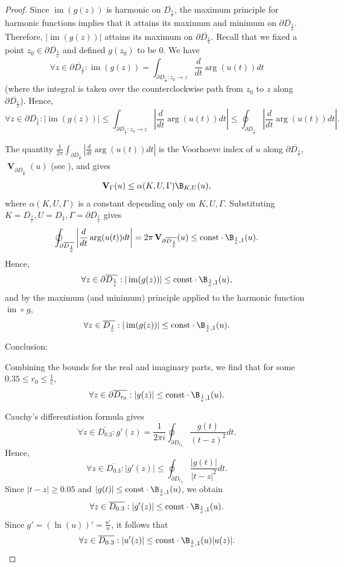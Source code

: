 \documentclass[reqno]{amsart}
\renewcommand{\paragraph}[1]{\medskip\noindent#1}
\theoremstyle{plain}
\theoremstyle{definition}
\theoremstyle{remark}
\theoremstyle{plain}
\begin{document}
\begin{proof}
Since $\operatorname{im}(g(z))$ is harmonic on $\overline{D_\frac1e}$, the maximum principle for harmonic functions implies that it attains its maximum and minimum on $\partial\overline{D_\frac1e}$. Therefore, $|\operatorname{im}(g(z))|$ attains its maximum on $\partial\overline{D_\frac1e}$. Recall that we fixed a point $z_0\in \partial\overline{D_\frac1e}$ and defined $g(z_0)$ to be $0$. We have
\[
    \forall z\in \partial\overline{D_\frac1e}:\operatorname{im}(g(z))=\int_{\partial\overline{D_\frac1e}:z_0\rightarrow z}\frac{d}{dt}\arg(u(t))dt
\]
(where the integral is taken over the counterclockwise path from $z_0$ to $z$ along $\partial\overline{D_\frac1e}$).
Hence,
\[
    \forall z\in \partial\overline{D_\frac1e}:|\operatorname{im}(g(z))|\leq\int_{\partial\overline{D_\frac1e}:z_0\rightarrow z}\left|\frac{d}{dt}\arg(u(t))dt\right|\leq\oint_{\partial\overline{D_\frac1e}}\left|\frac{d}{dt}\arg(u(t))dt\right|
.\]

The quantity $\frac1{2\pi}\int_{\partial\overline{D_\frac1e}}\left|\frac{d}{dt}\arg(u(t))dt\right|$ is the Voorhoeve index of $u$ along $\partial\overline{D_\frac1e}$, $\operatorname{\mathbf{V}}_{\partial\overline{D_\frac1e}}(u)$ (see \cite{KhovanskiiYakovenko1996GeneralizedRolleTheoremInRnAndC}), and \cite[Theorem 3]{KhovanskiiYakovenko1996GeneralizedRolleTheoremInRnAndC} gives
\[
    \operatorname{\mathbf{V}}_\Gamma(u)\leq\alpha(K,U,\Gamma)\B_{K,U}(u)
,\]
where $\alpha(K,U,\Gamma)$ is a constant depending only on $K,U,\Gamma$.
Substituting $K=\overline{D_\frac1e},U=D_1,\Gamma=\partial\overline{D_\frac1e}$ gives
\[
    \oint_{\partial\overline{D_\frac1e}}\left|\frac{d}{dt}\arg(u(t))dt\right|=2\pi\operatorname{\mathbf{V}}_{\partial\overline{D_\frac1e}}(u)\leq \mathrm{const}\cdot\B_{\frac1e,1}(u)
.\]
Hence,
\[
    \forall z\in \partial\overline{D_\frac1e}:|\operatorname{im}(g(z))|\leq \mathrm{const}\cdot\B_{\frac1e,1}(u)
,\]
and by the maximum (and minimum) principle applied to the harmonic function $\operatorname{im}\circ\,g$,
\[
    \forall z\in\overline{D_\frac1e}:|\operatorname{im}(g(z))|\leq \mathrm{const}\cdot\B_{\frac1e,1}(u)
.\]

\paragraph{Conclusion:}

Combining the bounds for the real and imaginary parts, we find that for some $0.35\leq r_0\leq\frac1e$,
\[
    \forall z\in \partial\overline{D_{r_0}}:|g(z)|\leq \mathrm{const}\cdot\B_{\frac1e,1}(u)
.\]

Cauchy's differentiation formula gives
\[
    \forall z\in\overline{D_{0.3}}:g'(z)=\frac1{2\pi i}\oint_{\partial\overline{D_{r_0}}}\frac{g(t)}{(t-z)^2}dt
.\]
Hence,
\[
    \forall z\in\overline{D_{0.3}}:|g'(z)|\leq\oint_{\partial\overline{D_{r_0}}}\frac{|g(t)|}{|t-z|^2}dt
.\]
Since $|t-z|\geq 0.05$ and $|g(t)|\leq \mathrm{const}\cdot\B_{\frac1e,1}(u)$, we obtain
\[
    \forall z\in\overline{D_{0.3}}:|g'(z)|\leq \mathrm{const}\cdot\B_{\frac1e,1}(u)
.\]
Since $g'=\left(\ln(u)\right)'=\frac{u'}{u}$, it follows that
\[
    \forall z\in\overline{D_{0.3}}:|u'(z)|\leq \mathrm{const}\cdot\B_{\frac1e,1}(u)|u(z)|
.\]
\end{proof}
\end{document}
